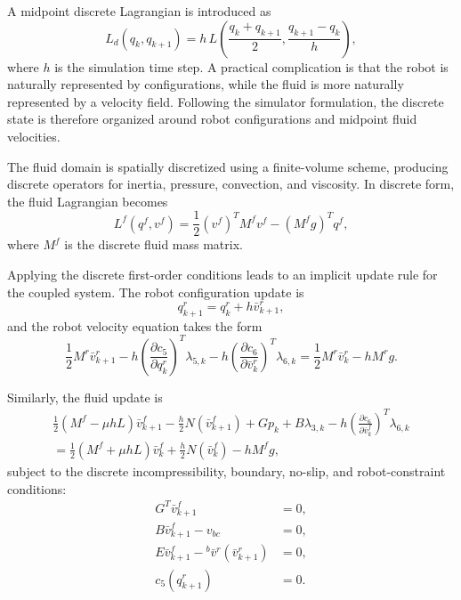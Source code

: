 A midpoint discrete Lagrangian is introduced as
\begin{equation}
L_d(q_k,q_{k+1})
=
h\,L\!\left(
\frac{q_k+q_{k+1}}{2},
\frac{q_{k+1}-q_k}{h}
\right),
\label{eq:thesis_midpoint_dl}
\end{equation}
where $h$ is the simulation time step. A practical complication is that the robot is naturally represented by configurations, while the fluid is more naturally represented by a velocity field. Following the simulator formulation, the discrete state is therefore organized around robot configurations and midpoint fluid velocities.

The fluid domain is spatially discretized using a finite-volume scheme, producing discrete operators for inertia, pressure, convection, and viscosity. In discrete form, the fluid Lagrangian becomes
\begin{equation}
L^f(q^f,v^f) = \frac{1}{2}(v^f)^T M^f v^f - (M^f g)^T q^f,
\label{eq:thesis_discrete_fluid_lagrangian}
\end{equation}
where $M^f$ is the discrete fluid mass matrix.

Applying the discrete first-order conditions leads to an implicit update rule for the coupled system. The robot configuration update is
\begin{equation}
q^r_{k+1} = q^r_k + h \bar{v}^r_{k+1},
\label{eq:thesis_robot_update}
\end{equation}
and the robot velocity equation takes the form
\begin{equation}
\frac{1}{2} M^r \bar{v}^r_{k+1}
- h \left( \frac{\partial c_5}{\partial q^r_k} \right)^T \lambda_{5,k}
- h \left( \frac{\partial c_6}{\partial \bar{v}^r_k} \right)^T \lambda_{6,k}
=
\frac{1}{2} M^r \bar{v}^r_k - h M^r g .
\label{eq:thesis_robot_variational}
\end{equation}

Similarly, the fluid update is
\begin{equation}
\begin{aligned}
\frac{1}{2}(M^f - \mu h L)\bar{v}^f_{k+1}
- \frac{h}{2} N(\bar{v}^f_{k+1})
+ G p_k
+ B \lambda_{3,k}
- h \left(\frac{\partial c_6}{\partial \bar{v}^f_k}\right)^T \lambda_{6,k} \\
=
\frac{1}{2}(M^f + \mu h L)\bar{v}^f_k
+ \frac{h}{2} N(\bar{v}^f_k)
- h M^f g ,
\end{aligned}
\label{eq:thesis_fluid_variational}
\end{equation}
subject to the discrete incompressibility, boundary, no-slip, and robot-constraint conditions:
\begin{align}
G^T \bar{v}^f_{k+1} &= 0, \label{eq:thesis_disc_incompressibility} \\
B\bar{v}^f_{k+1} - v_{bc} &= 0, \label{eq:thesis_disc_bc} \\
E\bar{v}^f_{k+1} - {}^b\bar{v}^r(\bar{v}^r_{k+1}) &= 0, \label{eq:thesis_disc_noslip} \\
c_5(q^r_{k+1}) &= 0. \label{eq:thesis_disc_robotconstraint}
\end{align}

